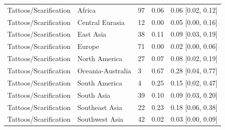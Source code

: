 \begin{longtable}{lllll}
Tattoos/Scarification & Africa & 97 & 0.06 & 0.06 [0.02, 0.12] \\
Tattoos/Scarification & Central Eurasia & 12 & 0.00 & 0.05 [0.00, 0.16] \\
Tattoos/Scarification & East Asia & 38 & 0.11 & 0.09 [0.03, 0.19] \\
Tattoos/Scarification & Europe & 71 & 0.00 & 0.02 [0.00, 0.06] \\
Tattoos/Scarification & North America & 27 & 0.07 & 0.08 [0.02, 0.19] \\
Tattoos/Scarification & Oceania-Australia & 3 & 0.67 & 0.28 [0.04, 0.77] \\
Tattoos/Scarification & South America & 4 & 0.25 & 0.15 [0.02, 0.47] \\
Tattoos/Scarification & South Asia & 39 & 0.10 & 0.09 [0.03, 0.20] \\
Tattoos/Scarification & Southeast Asia & 22 & 0.23 & 0.18 [0.06, 0.38] \\
Tattoos/Scarification & Southwest Asia & 42 & 0.02 & 0.03 [0.00, 0.09] \\
\end{longtable}
